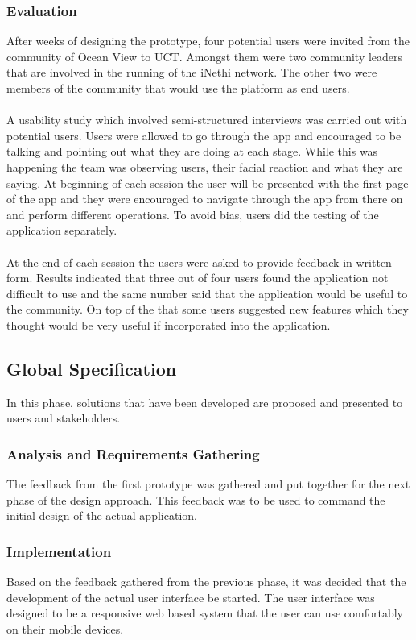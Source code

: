 \subsubsection{Evaluation}
After weeks of designing the prototype, four potential users were invited from the community of Ocean View to UCT. Amongst them were two community leaders that are involved in the running of the iNethi network. The other two were members of the community that would use the platform as end users.
\paragraph{}
A usability study which involved semi-structured interviews was carried out with potential users. Users were allowed to go through the app and encouraged to be talking and pointing out what they are doing at each stage. While this was happening the team was observing users, their facial reaction and what they are saying. At beginning of each session the user will be presented with the first page of the app and they were encouraged to navigate through the app from there on and perform different operations. To avoid bias, users did the testing of the application separately.
\paragraph{}
At the end of each session the users were asked to provide feedback in written form. Results indicated that three out of four users found the application not difficult to use and the same number said that the application would be useful to the community. On top of the that some users suggested new features which they thought would be very useful if incorporated into the application.

\subsection{Global Specification}
In this phase, solutions that have been developed are proposed and presented to users and stakeholders\cite{Kulykinbook}.
\subsubsection{Analysis and Requirements Gathering}
The feedback from the first prototype was gathered and put together for the next phase of the design approach. This feedback was to be used to command the initial design of the actual application.
\subsubsection{Implementation}
Based on the feedback gathered from the previous phase, it was decided that the development of the actual user interface be started. The user interface was designed to be a responsive web based system that the user can use comfortably on their mobile devices.
